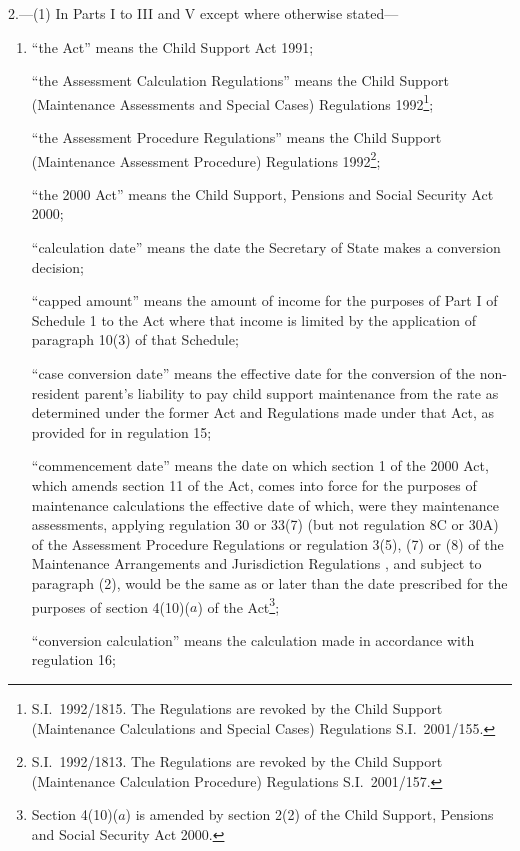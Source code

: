 \documentclass[12pt,a4paper]{article}
\begin{document}
2.---(1)  In Parts I to III and V except where otherwise stated—
\begin{enumerate}\item[]
“the Act” means the Child Support Act 1991;

“the Assessment Calculation Regulations” means the Child Support (Maintenance Assessments and Special Cases) Regulations 1992\footnote{S.I.\ 1992/1815. The Regulations are revoked by the Child Support (Maintenance Calculations and Special Cases) Regulations S.I.\ 2001/155.};

“the Assessment Procedure Regulations” means the Child Support (Maintenance Assessment Procedure) Regulations 1992\footnote{S.I.\ 1992/1813. The Regulations are revoked by the Child Support (Maintenance Calculation Procedure) Regulations S.I.\ 2001/157.};

“the 2000 Act” means the Child Support, Pensions and Social Security Act 2000;

“calculation date” means the date the Secretary of State makes a conversion decision;

“capped amount” means the amount of income for the purposes of Part I of Schedule 1 to the Act where that income is limited by the application of paragraph 10(3) of that Schedule;

“case conversion date” means the effective date for the conversion of the non-resident parent’s liability to pay child support maintenance from the rate as determined under the former Act and Regulations made under that Act, as provided for in regulation 15;

“commencement date” means the date on which section 1 of the 2000 Act, which amends section 11 of the Act, comes into force for the purposes of maintenance calculations the effective date of which, were they maintenance assessments, applying 
regulation 30 or 33(7) (but not regulation 8C or 30A) of the Assessment Procedure Regulations or regulation 3(5), (7) or (8) of the Maintenance Arrangements and Jurisdiction Regulations%
, and subject to paragraph (2), would be the same as or later than the date prescribed for the purposes of section 4(10)($a$)  of the Act\footnote{\frenchspacing Section 4(10)($a$) is amended by section 2(2) of the Child Support, Pensions and Social Security Act 2000.};

“conversion calculation” means the calculation made in accordance with regulation 16;


\end{enumerate}
\end{document}
